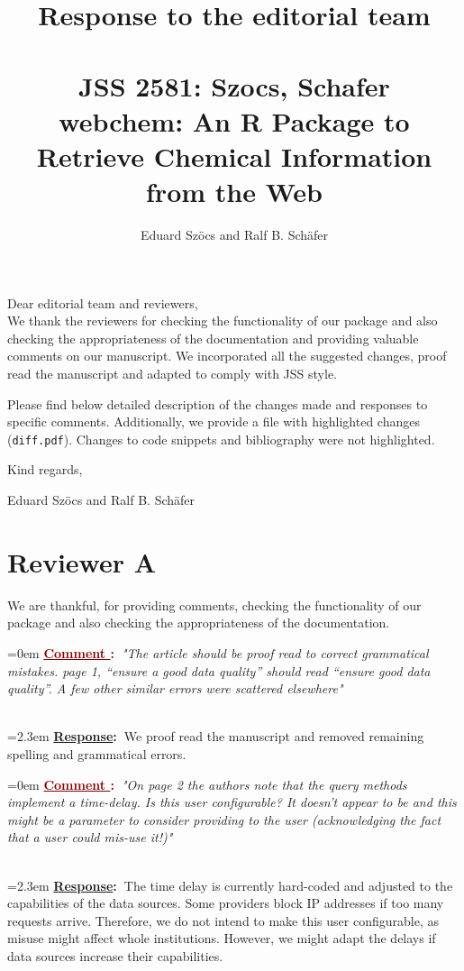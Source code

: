 \documentclass[12pt]{article}
\newcounter{cN}
\newcommand{\comment}[1]{
	\vspace{2em} 
	\refstepcounter{cN} %
	\noindent \hangindent=0em \textbf{\textcolor{Maroon}{\uline{Comment \thecN}:~}}\emph{"#1"}
	}
\newcommand{\response}[1]{
	\\[0.25em] 
	\hangindent=2.3em \textbf{\textcolor{NavyBlue}{\uline{Response}:~}}#1 
	}
\begin{document}
\title{Response to the editorial team\\~\\JSS 2581: Szocs, Schafer \\ webchem: An R Package to Retrieve Chemical Information from the Web}

\author{Eduard Szöcs and Ralf B. Schäfer}

\maketitle
\noindent Dear editorial team and reviewers,\\

\noindent
We thank the reviewers for checking the functionality of our package and also checking the appropriateness of the documentation and providing valuable comments on our manuscript.
We incorporated all the suggested changes, proof read the manuscript and adapted to comply with JSS style.

\noindent
Please find below detailed description of the changes made and responses to specific comments. 
Additionally, we provide a file with highlighted changes (\texttt{diff.pdf}).
Changes to code snippets and bibliography were not highlighted.


\vspace{2em}
\hfill Kind regards,

\hfill Eduard Szöcs and Ralf B. Schäfer
\newpage




\section{Reviewer A}

We are thankful, for providing comments, checking the functionality of our package and also checking the appropriateness of the documentation.

\comment{The article should be proof read to correct grammatical mistakes. page 1, “ensure a good data quality” should read “ensure good data quality”. A few other similar errors were scattered elsewhere}
\response{We proof read the manuscript and removed remaining spelling and grammatical errors.}

\comment{On page 2 the authors note that the query methods implement a time-delay. Is this user configurable? It doesn’t appear to be and this might be a parameter to consider providing to the user (acknowledging the fact that a user could mis-use it!)}
\response{The time delay is currently hard-coded and adjusted to the capabilities of the data sources.
Some providers block IP addresses if too many requests arrive.
Therefore, we do not intend to make this user configurable, as misuse might affect whole institutions.
However, we might adapt the delays if data sources increase their capabilities. 
}
\end{document}
